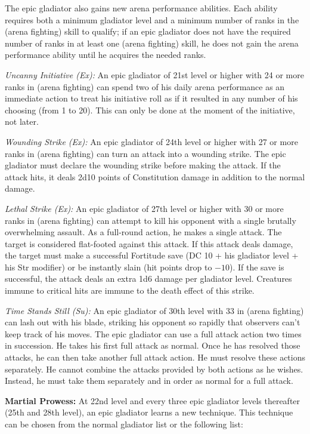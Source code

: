 The epic gladiator also gains new arena performance abilities. Each ability requires both a minimum gladiator level and a minimum number of ranks in the  (arena fighting) skill to qualify; if an epic gladiator does not have the required number of ranks in at least one  (arena fighting) skill, he does not gain the arena performance ability until he acquires the needed ranks.

\textit{Uncanny Initiative (Ex):} An epic gladiator of 21st level or higher with 24 or more ranks in  (arena fighting) can spend two of his daily arena performance as an immediate action to treat his initiative roll as if it resulted in any number of his choosing (from 1 to 20). This can only be done at the moment of the initiative, not later.

\textit{Wounding Strike (Ex):} An epic gladiator of 24th level or higher with 27 or more ranks in  (arena fighting) can turn an attack into a wounding strike. The epic gladiator must declare the wounding strike before making the attack. If the attack hits, it deals 2d10 points of Constitution damage in addition to the normal damage.

\textit{Lethal Strike (Ex):}  An epic gladiator of 27th level or higher with 30 or more ranks in  (arena fighting) can attempt to kill his opponent with a single brutally overwhelming assault. As a full-round action, he makes a single attack. The target is considered flat-footed against this attack. If this attack deals damage, the target must make a successful Fortitude save (DC 10 + \onehalf his gladiator level + his Str modifier) or be instantly slain (hit points drop to $-10$). If the save is successful, the attack deals an extra 1d6 damage per gladiator level. Creatures immune to critical hits are immune to the death effect of this strike.

\textit{Time Stands Still (Su):} An epic gladiator of 30th level with 33 in  (arena fighting) can lash out with his blade, striking his opponent so rapidly that observers can't keep track of his moves. The epic gladiator can use a full attack action two times in succession. He takes his first full attack as normal. Once he has resolved those attacks, he can then take another full attack action. He must resolve these actions separately. He cannot combine the attacks provided by both actions as he wishes. Instead, he must take them separately and in order as normal for a full attack.

\textbf{Martial Prowess:} At 22nd level and every three epic gladiator levels thereafter (25th and 28th level), an epic gladiator learns a new technique. This technique can be chosen from the normal gladiator list or the following list:

